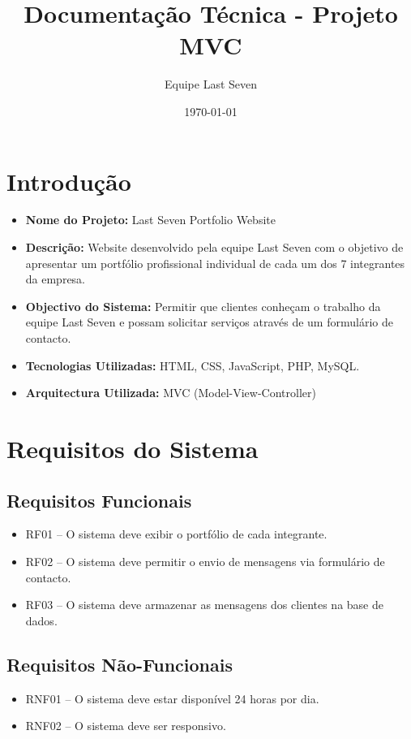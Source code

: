 \documentclass[12pt]{article}
\title{Documentação Técnica - Projeto MVC}
\author{Equipe Last Seven}
\date{\today}
\begin{document}
\maketitle

\section{Introdução}
\begin{itemize}
  \item \textbf{Nome do Projeto:} Last Seven Portfolio Website
  \item \textbf{Descrição:} Website desenvolvido pela equipe Last Seven com o objetivo de apresentar um portfólio profissional individual de cada um dos 7 integrantes da empresa.
  \item \textbf{Objectivo do Sistema:} Permitir que clientes conheçam o trabalho da equipe Last Seven e possam solicitar serviços através de um formulário de contacto.
  \item \textbf{Tecnologias Utilizadas:} HTML, CSS, JavaScript, PHP, MySQL.
  \item \textbf{Arquitectura Utilizada:} MVC (Model-View-Controller)
\end{itemize}

\section{Requisitos do Sistema}

\subsection{Requisitos Funcionais}
\begin{itemize}
  \item RF01 – O sistema deve exibir o portfólio de cada integrante.
  \item RF02 – O sistema deve permitir o envio de mensagens via formulário de contacto.
  \item RF03 – O sistema deve armazenar as mensagens dos clientes na base de dados.
\end{itemize}

\subsection{Requisitos Não-Funcionais}
\begin{itemize}
  \item RNF01 – O sistema deve estar disponível 24 horas por dia.
  \item RNF02 – O sistema deve ser responsivo.
\end{itemize}
\end{document}
